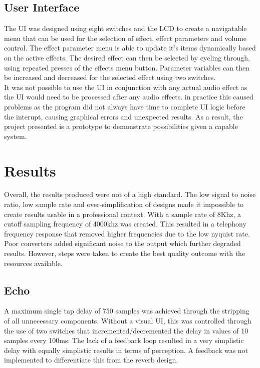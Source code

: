 \documentclass[titlepage]{scrartcl}
\begin{document}
    \subsection{User Interface}
    The UI was designed using eight switches and the LCD to create a
    navigatable menu that can be used for the selection of effect, effect
    parameters and volume control. The effect parameter menu is able to update
    it's items dynamically based on the active effects. The desired effect can
    then be selected by cycling through, using repeated presses of the effects
    menu button. Parameter variables can then be increased and decreased for
    the selected effect using two switches.\\
    It was not possible to use the UI in conjunction with any actual audio
    effect as the UI would need to be processed after any audio effects. in
    practice this caused problems as the program did not always have time to
    complete UI logic before the interupt, causing graphical errors and
    unexpected results. As a result, the project presented is a prototype to
    demonstrate possibilities given a capable system.

    \section{Results}
    Overall, the results produced were not of a high standard. The low signal
    to noise ratio, low sample rate and over-simplification of designs made it
    impossible to create results usable in a professional context. With a
    sample rate of 8Khz, a cutoff sampling frequency of 4000khz was created.
    This resulted in a telephony frequency response that removed higher
    frequencies due to the low nyquist rate. Poor converters added significant
    noise to the output which further degraded results. However, steps were
    taken to create the best quality outcome with the resources available.

        \subsection{Echo}
        A maximum single tap delay of 750 samples was achieved through the
        stripping of all unnecessary components. Without a visual UI,
        this was controlled through the use of two switches that
        incremented/decremented the delay in values of 10 samples every 100ms. 
        The lack of a feedback loop resulted in a very simplistic delay with
        equally simplistic results in terms of perception. A feedback was not
        implemented to differentiate this from the reverb design.
\end{document}
